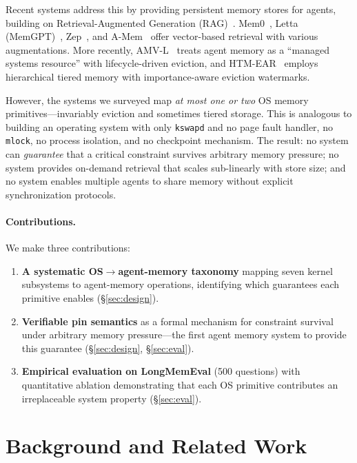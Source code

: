 \documentclass[10pt,twocolumn]{article}
\begin{document}
Recent systems address this by providing persistent memory stores for agents, building on Retrieval-Augmented Generation (RAG)~\cite{rag2020lewis}. Mem0~\cite{mem0}, Letta (MemGPT)~\cite{memgpt2023}, Zep~\cite{zep2024}, and A-Mem~\cite{amem2025} offer vector-based retrieval with various augmentations. More recently, AMV-L~\cite{amvl2026} treats agent memory as a ``managed systems resource'' with lifecycle-driven eviction, and HTM-EAR~\cite{htmear2026} employs hierarchical tiered memory with importance-aware eviction watermarks.

However, the systems we surveyed map \emph{at most one or two} OS memory primitives---invariably eviction and sometimes tiered storage. This is analogous to building an operating system with only \texttt{kswapd} and no page fault handler, no \texttt{mlock}, no process isolation, and no checkpoint mechanism. The result: no system can \emph{guarantee} that a critical constraint survives arbitrary memory pressure; no system provides on-demand retrieval that scales sub-linearly with store size; and no system enables multiple agents to share memory without explicit synchronization protocols.

\paragraph{Contributions.} We make three contributions:
\begin{enumerate}[leftmargin=*,nosep]
  \item \textbf{A systematic OS$\to$agent-memory taxonomy} mapping seven kernel subsystems to agent-memory operations, identifying which guarantees each primitive enables (\S\ref{sec:design}).
  \item \textbf{Verifiable pin semantics} as a formal mechanism for constraint survival under arbitrary memory pressure---the first agent memory system to provide this guarantee (\S\ref{sec:design}, \S\ref{sec:eval}).
  \item \textbf{Empirical evaluation on LongMemEval} (500 questions) with quantitative ablation demonstrating that each OS primitive contributes an irreplaceable system property (\S\ref{sec:eval}).
\end{enumerate}

\section{Background and Related Work}
\label{sec:related}
\end{document}
